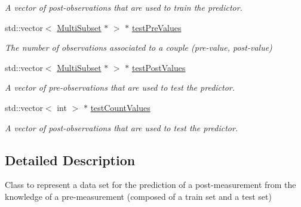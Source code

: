 \begin{DoxyCompactItemize}
\begin{DoxyCompactList}\small\item\em A vector of post-\/observations that are used to train the predictor. \end{DoxyCompactList}\item 
\hypertarget{classPredictionDataset_a6ef1712f6f3e944cad7f966b123c44d4}{std\-::vector$<$ \hyperlink{classMultiSubset}{Multi\-Subset} $\ast$ $>$ $\ast$ \hyperlink{classPredictionDataset_a6ef1712f6f3e944cad7f966b123c44d4}{test\-Pre\-Values}}\label{classPredictionDataset_a6ef1712f6f3e944cad7f966b123c44d4}

\begin{DoxyCompactList}\small\item\em The number of observations associated to a couple (pre-\/value, post-\/value) \end{DoxyCompactList}\item 
\hypertarget{classPredictionDataset_ab6ed50cd17878109b9a41ebb6db172ea}{std\-::vector$<$ \hyperlink{classMultiSubset}{Multi\-Subset} $\ast$ $>$ $\ast$ \hyperlink{classPredictionDataset_ab6ed50cd17878109b9a41ebb6db172ea}{test\-Post\-Values}}\label{classPredictionDataset_ab6ed50cd17878109b9a41ebb6db172ea}

\begin{DoxyCompactList}\small\item\em A vector of pre-\/observations that are used to test the predictor. \end{DoxyCompactList}\item 
\hypertarget{classPredictionDataset_a7fe2eccbdae1cee136f5864b660c31ee}{std\-::vector$<$ int $>$ $\ast$ \hyperlink{classPredictionDataset_a7fe2eccbdae1cee136f5864b660c31ee}{test\-Count\-Values}}\label{classPredictionDataset_a7fe2eccbdae1cee136f5864b660c31ee}

\begin{DoxyCompactList}\small\item\em A vector of post-\/observations that are used to test the predictor. \end{DoxyCompactList}\end{DoxyCompactItemize}


\subsection{Detailed Description}
Class to represent a data set for the prediction of a post-\/measurement from the knowledge of a pre-\/measurement (composed of a train set and a test set) 

